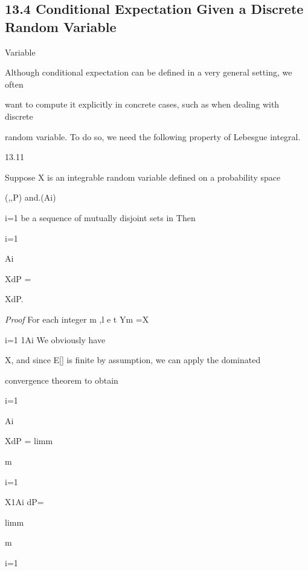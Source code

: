 \subsection*{13.4 Conditional Expectation Given a Discrete Random Variable}

Variable

Although conditional expectation can be defined in a very general setting, we often

want to compute it explicitly in concrete cases, such as when dealing with discrete

random variable. To do so, we need the following property of Lebesgue integral.

\begin{thmbox}{13.11}
\end{thmbox}

Suppose X is an integrable random variable defined on a probability space

(\Omega,,P) and.(Ai)\infty

i=1 be a sequence of mutually disjoint sets in Then

\infty\sum

i=1

\int

Ai

XdP =

\int

\cupiAi

XdP.

\textit{Proof} For each integer m ,l e t Ym =X \summ

i=1 1Ai We obviously have

\vertYm\vert\leq\vert X\vert, and since E[\vertX\vert] is finite by assumption, we can apply the dominated

convergence theorem to obtain

\infty\sum

i=1

\int

Ai

XdP = limm\to\infty

m\sum

i=1

\int

\Omega

X1Ai dP=

\int

\Omega

limm\to\infty

m\sum

i=1

